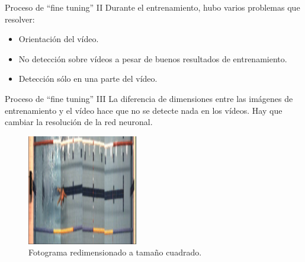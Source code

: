 \documentclass[11pt]{beamer}
\begin{document}
        \begin{frame}{Proceso de ``fine tuning'' II}
        Durante el entrenamiento, hubo varios problemas que resolver:
        \begin{itemize}
            \item Orientación del vídeo.
            \item No detección sobre vídeos a pesar de buenos resultados de entrenamiento.
            \item Detección sólo en una parte del vídeo.
        \end{itemize}
            
        \end{frame}
        
        \begin{frame}{Proceso de ``fine tuning'' III}
            La diferencia de dimensiones entre las imágenes de entrenamiento y el vídeo hace que no se detecte nada en los vídeos. Hay que cambiar la resolución de la red neuronal. 
            
            \begin{figure}[h!]
                \centering
                    \includegraphics[width=0.43\textwidth,height=0.43\textheight,keepaspectratio]{imagenes/416x416_YOLO_resize.png}
                 \caption{Fotograma redimensionado a tamaño cuadrado.}
                 \label{fig:yolosizeexample}
            \end{figure}
            
        \end{frame}
        
\end{document}
